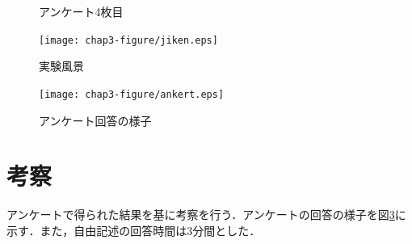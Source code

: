 \begin{figure}[tbp]
	\centering
	\caption{アンケート4枚目}
	\label{fig:ank4}
\end{figure}

\begin{figure}[tbp]
	\centering
			\texttt{[image: chap3-figure/jiken.eps]}
	\caption{実験風景}
	\label{fig:jiken}
\end{figure}

\begin{figure}[tbp]
	\centering
			\texttt{[image: chap3-figure/ankert.eps]}
	\caption{アンケート回答の様子}
	\label{fig:ankkai}
\end{figure}

\section{考察}
アンケートで得られた結果を基に考察を行う．アンケートの回答の様子を図\ref{fig:ankkai}に示す．また，自由記述の回答時間は3分間とした．

